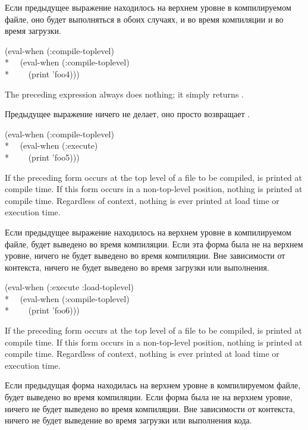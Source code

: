 \begin{newer}
\begin{defspec}
Если предыдущее выражение находилось на верхнем уровне в компилируемом файле, оно
будет выполняться в обоих случаях, и во время компиляции и во время загрузки.
\begin{lisp}
(eval-when (:compile-toplevel) \\*
~~(eval-when (:compile-toplevel)  \\*
~~~~(print 'foo4)))
\end{lisp}
  The preceding expression always does nothing; it simply returns .

Предыдущее выражение ничего не делает, оно просто возвращает .

\begin{lisp}
(eval-when (:compile-toplevel)  \\*
~~(eval-when (:execute) \\*
~~~~(print 'foo5)))
\end{lisp}
  If the preceding form occurs at the top level of a file to be compiled,
        is
       printed at compile time. If this form occurs in a non-top-level
       position, nothing is printed at compile time. Regardless of context,
       nothing is ever printed at load time or execution time.

Если предыдущее выражение находилось на верхнем уровне в компилируемом файле,
 будет выведено во время компиляции. Если эта форма была не на верхнем
уровне, ничего не будет выведено во время компиляции. Вне зависимости от 
контекста, ничего не будет выведено во время загрузки или выполнения.

\begin{lisp}
(eval-when (:execute :load-toplevel) \\*
~~(eval-when (:compile-toplevel) \\*
~~~~(print 'foo6)))
\end{lisp}

    If the preceding form occurs at the top level of a file to be compiled,
        is
       printed at compile time.  If this form occurs in a non-top-level
       position, nothing is printed at compile time. Regardless of context,
       nothing is ever printed at load time or execution time.

Если предыдущая форма находилась на верхнем уровне в компилируемом файле,
 будет выведено во время компиляции. Если форма была не на верхнем
уровне, ничего не будет выведено во время компиляции. Вне зависимости от
контекста, ничего не будет выведение во время загрузки или выполнения кода.
\end{defspec}
\end{newer}